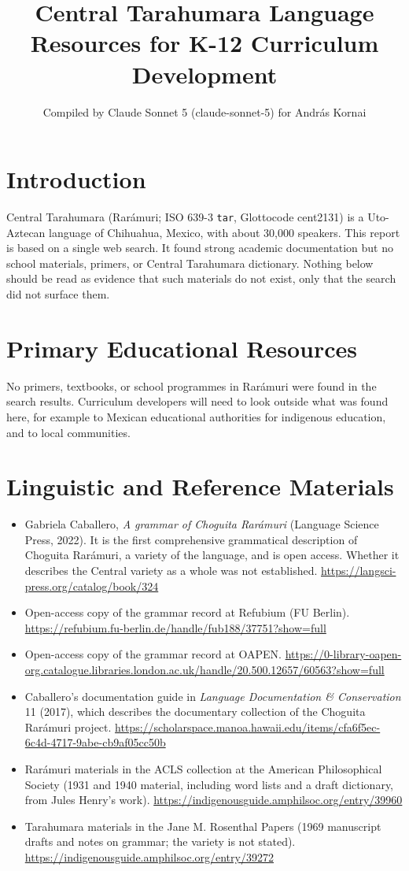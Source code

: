 \documentclass[12pt]{article}
\title{Central Tarahumara Language Resources for K-12 Curriculum Development}
\author{Compiled by Claude Sonnet 5 (claude-sonnet-5) for Andr\'as Kornai}
\date{}
\begin{document}
\maketitle

\section{Introduction}
Central Tarahumara (Rar\'amuri; ISO 639-3 \texttt{tar}, Glottocode cent2131) is a Uto-Aztecan language of Chihuahua, Mexico, with about 30,000 speakers. This report is based on a single web search. It found strong academic documentation but no school materials, primers, or Central Tarahumara dictionary. Nothing below should be read as evidence that such materials do not exist, only that the search did not surface them.

\section{Primary Educational Resources}
No primers, textbooks, or school programmes in Rar\'amuri were found in the search results. Curriculum developers will need to look outside what was found here, for example to Mexican educational authorities for indigenous education, and to local communities.

\section{Linguistic and Reference Materials}
\begin{itemize}
\item Gabriela Caballero, \emph{A grammar of Choguita Rar\'amuri} (Language Science Press, 2022). It is the first comprehensive grammatical description of Choguita Rar\'amuri, a variety of the language, and is open access. Whether it describes the Central variety as a whole was not established. \url{https://langsci-press.org/catalog/book/324}
\item Open-access copy of the grammar record at Refubium (FU Berlin). \url{https://refubium.fu-berlin.de/handle/fub188/37751?show=full}
\item Open-access copy of the grammar record at OAPEN. \url{https://0-library-oapen-org.catalogue.libraries.london.ac.uk/handle/20.500.12657/60563?show=full}
\item Caballero's documentation guide in \emph{Language Documentation \& Conservation} 11 (2017), which describes the documentary collection of the Choguita Rar\'amuri project. \url{https://scholarspace.manoa.hawaii.edu/items/cfa6f5ec-6c4d-4717-9abe-cb9af05cc50b}
\item Rar\'amuri materials in the ACLS collection at the American Philosophical Society (1931 and 1940 material, including word lists and a draft dictionary, from Jules Henry's work). \url{https://indigenousguide.amphilsoc.org/entry/39960}
\item Tarahumara materials in the Jane M. Rosenthal Papers (1969 manuscript drafts and notes on grammar; the variety is not stated). \url{https://indigenousguide.amphilsoc.org/entry/39272}
\end{itemize}
\end{document}
